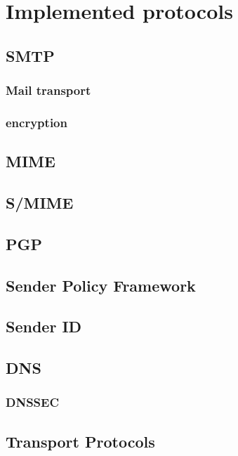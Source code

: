 \documentclass[11pt,a4paper]{book}
\begin{document}
\section{Implemented protocols}
\subsection{SMTP}
\cite{RFC5321}
\subsubsection{Mail transport}
\cite{RFC1870}
\subsubsection{encryption}

\subsection{MIME}
\cite{RFC2045}
\cite{RFC2046}
\cite{RFC2047}
\cite{RFC2048}
\cite{RFC2049}

\subsection{S/MIME}
\cite{RFC3851}

\subsection{PGP}
\cite{RFC2440}

\subsection{Sender Policy Framework}
\cite{RFC4408}
\cite{RFC6652}

\subsection{Sender ID}
\cite{RFC4401}

\subsection{DNS}
\subsubsection{DNSSEC}

\subsection{Transport Protocols}
\end{document}
